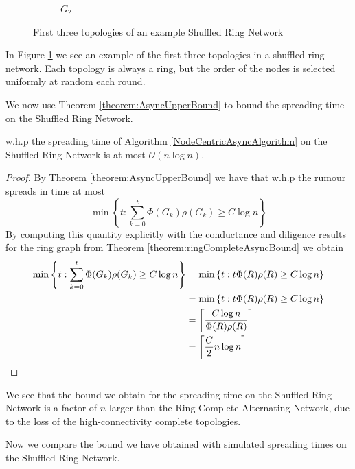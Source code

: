 \begin{figure}[h]
\begin{subfigure}[b]{0.3\textwidth}
		\caption*{$G_2$}
	\end{subfigure}
	\caption{First three topologies of an example Shuffled Ring Network}
	\label{fig:shuffledRingExample}
\end{figure}

In Figure \ref{fig:shuffledRingExample} we see an example of the first three topologies in a shuffled ring network. Each topology is always a ring, but the order of the nodes is selected uniformly at random each round.

We now use Theorem \ref{theorem:AsyncUpperBound} to bound the spreading time on the Shuffled Ring Network.

\begin{theorem}
	w.h.p the spreading time of Algorithm \ref{NodeCentricAsyncAlgorithm} on the Shuffled Ring Network is at most $\mathcal{O}(n \log n)$.
\end{theorem}

\begin{proof}
	By Theorem \ref{theorem:AsyncUpperBound} we have that w.h.p the rumour spreads in time at most 
	$$
		\min \left\{t : \sum_{k=0}^t \Phi(G_k)\rho(G_k) \geq C \log n \right\} 
	$$
	By computing this quantity explicitly with the conductance and diligence results for the ring graph from Theorem \ref{theorem:ringCompleteAsyncBound} we obtain
	\begin{align*}
		\min \left\{t : \sum_{k=0}^t \Phi(G_k)\rho(G_k) \geq C \log n \right\} 
		&= \min \left\{t : t \Phi(R)\rho(R) \geq C \log n \right\} \\
		&= \min \left\{t : t \Phi(R)\rho(R) \geq C \log n \right\} \\
		&= \ceil*{\frac{C \log n}{\Phi(R)\rho(R)}} \\
		&= \ceil*{\frac{C}{2}n \log n}
	\end{align*}
\end{proof}

We see that the bound we obtain for the spreading time on the Shuffled Ring Network is a factor of $n$ larger than the Ring-Complete Alternating Network, due to the loss of the high-connectivity complete topologies. 

Now we compare the bound we have obtained with simulated spreading times on the Shuffled Ring Network.

